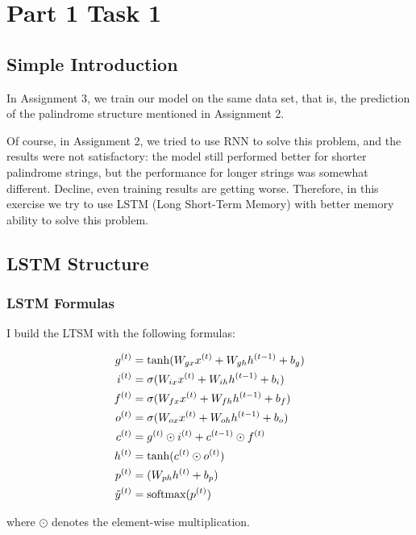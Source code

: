 \section{Part 1 Task 1}

\subsection{Simple Introduction}

In Assignment 3, we train our model on the same data set, that is, the prediction of the palindrome structure mentioned in Assignment 2.

Of course, in Assignment 2, we tried to use RNN to solve this problem, and the results were not satisfactory:
the model still performed better for shorter palindrome strings, but the performance for longer strings was somewhat different. Decline, even training results are getting worse.
Therefore, in this exercise we try to use LSTM (Long Short-Term Memory) \cite{sepp1997long} with better memory ability to solve this problem.

\subsection{LSTM Structure}

\subsubsection{LSTM Formulas}

I build the LTSM with the following formulas:

\begin{align}
  g^{(t)} &= \tanh(W_{gx}x^{(t)} + W_{gh}h^{(t-1)} + b_{g})\\
  i^{(t)} &= \sigma(W_{ix}x^{(t)} + W_{ih}h^{(t-1)} + b_{i})\\
  f^{(t)} &= \sigma(W_{fx}x^{(t)} + W_{fh}h^{(t-1)} + b_{f})\\
  o^{(t)} &= \sigma(W_{ox}x^{(t)} + W_{oh}h^{(t-1)} + b_{o})\\
  c^{(t)} &= g^{(t)} \odot i^{(t)} + c^{(t-1)} \odot f^{(t)}\\
  h^{(t)} &= \tanh(c^{(t)} \odot o^{(t)})\\
  p^{(t)} &= (W_{ph}h^{(t)} + b_{p})\\
  \Tilde{y}^{(t)} &= \text{softmax}(p^{(t)})
\end{align}

where $\odot$ denotes the element-wise multiplication.

